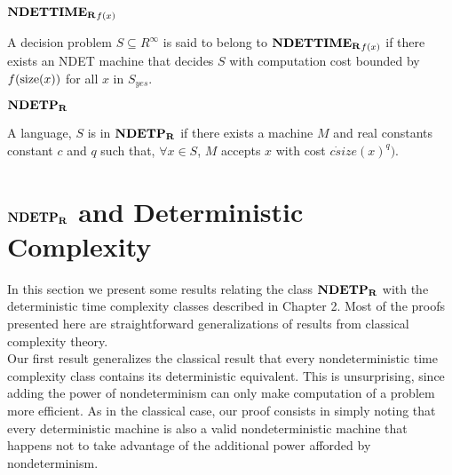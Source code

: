 
\begin{definition}{$\mathbf{NDETTIME_R}_{f(x)}$}

  A decision problem $S \subseteq R^\infty$ is said to belong to
  $\mathbf{NDETTIME_R}_{f(x)}$ if there exists an NDET machine that decides $S$
  with computation cost bounded by $f(\text{size}(x))$ for all $x$ in
  $S_{yes}$.
  
\end{definition}

\begin{definition} $\mathbf{NDETP_R}$
  
  A language, $S$ is in $\mathbf{NDETP_R}$ if there exists a machine $M$ and
  real constants constant $c$ and $q$ such that, $\forall x \in S$,
  $M$ accepts $x$ with cost $c \dot size(x)^q)$.
  
\end{definition}

\section{$\mathbf{NDETP_R}$ and Deterministic Complexity}

In this section we present some results relating the class $\mathbf{NDETP_R}$
with the deterministic time complexity classes described in Chapter 2.
Most of the proofs presented here are straightforward generalizations
of results from classical complexity theory.\\

Our first result generalizes the classical result that every
nondeterministic time complexity class contains its deterministic
equivalent.  This is unsurprising, since adding the power of
nondeterminism can only make computation of a problem more efficient.
As in the classical case, our proof consists in simply noting that
every deterministic machine is also a valid nondeterministic machine
that happens not to take advantage of the additional power afforded by
nondeterminism.


